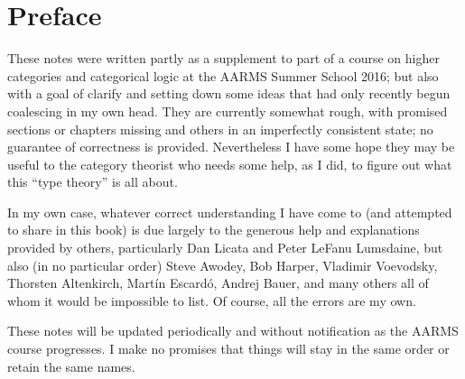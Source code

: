 \chapter{Preface}

These notes were written partly as a supplement to part of a course on higher categories and categorical logic at the AARMS Summer School 2016; but also with a goal of clarify and setting down some ideas that had only recently begun coalescing in my own head.
They are currently somewhat rough, with promised sections or chapters missing and others in an imperfectly consistent state; no guarantee of correctness is provided.
Nevertheless I have some hope they may be useful to the category theorist who needs some help, as I did, to figure out what this ``type theory'' is all about.

In my own case, whatever correct understanding I have come to (and attempted to share in this book) is due largely to the generous help and explanations provided by others, particularly Dan Licata and Peter LeFanu Lumsdaine, but also (in no particular order) Steve Awodey, Bob Harper, Vladimir Voevodsky, Thorsten Altenkirch, Mart\'in Escard\'o, Andrej Bauer, and many others all of whom it would be impossible to list.
Of course, all the errors are my own.

These notes will be updated periodically and without notification as the AARMS course progresses.
I make no promises that things will stay in the same order or retain the same names.


